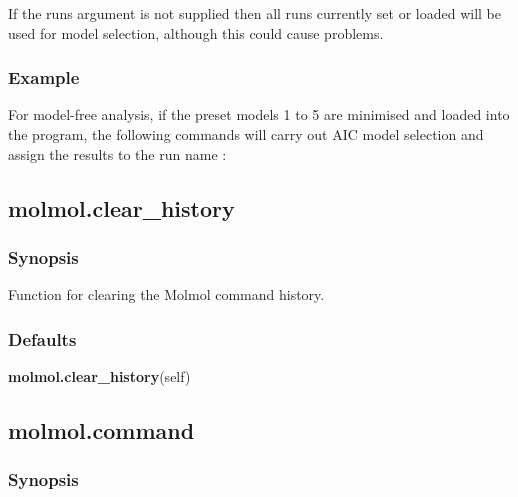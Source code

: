 If the runs argument is not supplied then all runs currently set or loaded will be used for
model selection, although this could cause problems.


\subsubsection{Example}

For model-free analysis, if the preset models 1 to 5 are minimised and loaded into the
program, the following commands will carry out AIC model selection and assign the results
to the run name 
:







\newpage

\subsection{molmol.clear\_history}


\subsubsection{Synopsis}

Function for clearing the Molmol command history.

\subsubsection{Defaults}

\textsf{\textbf{molmol.clear\_history}(self)}



\newpage

\subsection{molmol.command}


\subsubsection{Synopsis}

